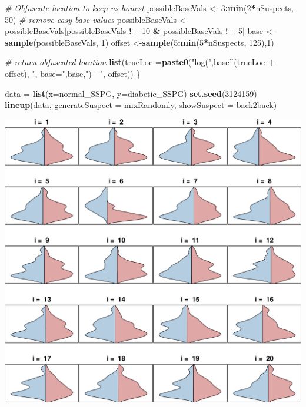 \documentclass[9pt,letter]{article}
\newenvironment{Shaded}{\begin{snugshade}}{\end{snugshade}}
\newcommand{\KeywordTok}[1]{\textcolor[rgb]{0.13,0.29,0.53}{\textbf{#1}}}
\newcommand{\DataTypeTok}[1]{\textcolor[rgb]{0.13,0.29,0.53}{#1}}
\newcommand{\DecValTok}[1]{\textcolor[rgb]{0.00,0.00,0.81}{#1}}
\newcommand{\StringTok}[1]{\textcolor[rgb]{0.31,0.60,0.02}{#1}}
\newcommand{\CommentTok}[1]{\textcolor[rgb]{0.56,0.35,0.01}{\textit{#1}}}
\newcommand{\OperatorTok}[1]{\textcolor[rgb]{0.81,0.36,0.00}{\textbf{#1}}}
\newcommand{\NormalTok}[1]{#1}
\begin{document}
\begin{Shaded}
\begin{Highlighting}[]
  \CommentTok{# Obfuscate location to keep us honest}
\NormalTok{  possibleBaseVals <-}\StringTok{ }\DecValTok{3}\OperatorTok{:}\KeywordTok{min}\NormalTok{(}\DecValTok{2}\OperatorTok{*}\NormalTok{nSuspects, }\DecValTok{50}\NormalTok{) }\CommentTok{# remove easy base values}
\NormalTok{  possibleBaseVals <-}\StringTok{ }\NormalTok{possibleBaseVals[possibleBaseVals }\OperatorTok{!=}\StringTok{ }\DecValTok{10} \OperatorTok{&}\StringTok{ }\NormalTok{possibleBaseVals }\OperatorTok{!=}\StringTok{ }\DecValTok{5}\NormalTok{]}
\NormalTok{  base <-}\KeywordTok{sample}\NormalTok{(possibleBaseVals, }\DecValTok{1}\NormalTok{)}
\NormalTok{  offset <-}\KeywordTok{sample}\NormalTok{(}\DecValTok{5}\OperatorTok{:}\KeywordTok{min}\NormalTok{(}\DecValTok{5}\OperatorTok{*}\NormalTok{nSuspects, }\DecValTok{125}\NormalTok{),}\DecValTok{1}\NormalTok{)}
  
  \CommentTok{# return obfuscated location}
  \KeywordTok{list}\NormalTok{(}\DataTypeTok{trueLoc =}\KeywordTok{paste0}\NormalTok{(}\StringTok{"log("}\NormalTok{,base}\OperatorTok{^}\NormalTok{(trueLoc }\OperatorTok{+}\StringTok{ }\NormalTok{offset),}
                       \StringTok{", base="}\NormalTok{,base,}\StringTok{") - "}\NormalTok{, offset))}
\NormalTok{\}}

\NormalTok{data =}\StringTok{ }\KeywordTok{list}\NormalTok{(}\DataTypeTok{x=}\NormalTok{normal_SSPG, }\DataTypeTok{y=}\NormalTok{diabetic_SSPG)}
\KeywordTok{set.seed}\NormalTok{(}\DecValTok{3124159}\NormalTok{)}
\KeywordTok{lineup}\NormalTok{(data,}
       \DataTypeTok{generateSuspect =}\NormalTok{ mixRandomly,}
       \DataTypeTok{showSuspect =}\NormalTok{ back2back)}
\end{Highlighting}
\end{Shaded}

\begin{center}\includegraphics{a4_testing_files/figure-latex/unnamed-chunk-6-1} \end{center}
\end{document}
